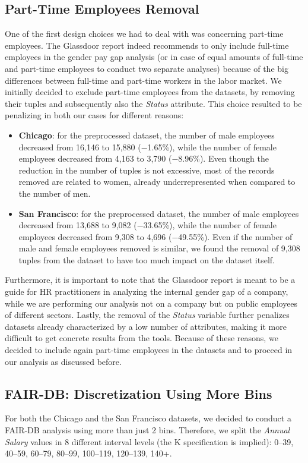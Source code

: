 \subsection{Part-Time Employees Removal}
\label{section:part-time_employees_removal}
One of the first design choices we had to deal with was concerning part-time employees. The Glassdoor report \cite{chamberlain2017analyze} indeed recommends to only include full-time employees in the gender pay gap analysis (or in case of equal amounts of full-time and part-time employees to conduct two separate analyses) because of the big differences between full-time and part-time workers in the labor market. We initially decided to exclude part-time employees from the datasets, by removing their tuples and subsequently also the \textit{Status} attribute. This choice resulted to be penalizing in both our cases for different reasons:
\begin{itemize}
\item \textbf{Chicago}: for the preprocessed dataset, the number of male employees decreased from 16,146 to 15,880 (\(-\)1.65\%), while the number of female employees decreased from 4,163 to 3,790 (\(-\)8.96\%). Even though the reduction in the number of tuples is not excessive, most of the records removed are related to women, already underrepresented when compared to the number of men.
\item \textbf{San Francisco}: for the preprocessed dataset, the number of male employees decreased from 13,688 to 9,082 (\(-\)33.65\%), while the number of female employees decreased from 9,308 to 4,696 (\(-\)49.55\%). Even if the number of male and female employees removed is similar, we found the removal of 9,308 tuples from the dataset to have too much impact on the dataset itself.
\end{itemize}
Furthermore, it is important to note that the Glassdoor report is meant to be a guide for HR practitioners in analyzing the internal gender gap of a company, while we are performing our analysis not on a company but on public employees of different sectors. Lastly, the removal of the \textit{Status} variable further penalizes datasets already characterized by a low number of attributes, making it more difficult to get concrete results from the tools. Because of these reasons, we decided to include again part-time employees in the datasets and to proceed in our analysis as discussed before.


\subsection{FAIR-DB: Discretization Using More Bins}
\label{section:fair-db_discretization_8_bins}
For both the Chicago and the San Francisco datasets, we decided to conduct a FAIR-DB analysis using more than just 2 bins. Therefore, we split the \textit{Annual Salary} values in 8 different interval levels (the K specification is implied): 0--39, 40--59, 60--79, 80--99, 100--119, 120--139, 140+.


